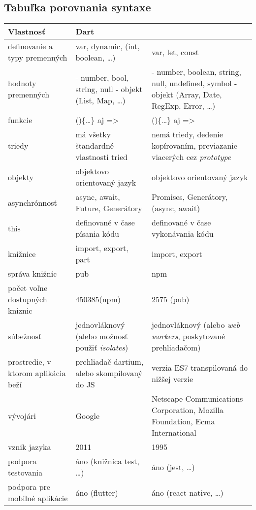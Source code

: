\subsection{Tabuľka porovnania syntaxe}
\label{tab:compare}

\begin{tabular}{| p{4cm} | p{5cm} | p{5cm} |}
 \hline         %
   Vlastnosť & Dart & \JS{} \\ %
  \hline
  \hline
   definovanie a typy premenných & 
   var, dynamic,  (int, boolean, \ldots)& %
   var, let, const \\
  \hline
   hodnoty premenných & 
   - number, bool, string, null \newline
   - objekt (List, Map, \ldots)
    & 
   - number, boolean, string, null, undefined, symbol \newline
   - objekt (Array, Date, RegExp, Error, \ldots)
    \\
  \hline
   funkcie & 
   ()\{\ldots\} aj => & 
   ()\{\ldots\} aj => \\
  \hline
   triedy & 
   má všetky štandardné vlastnosti tried & 
   nemá triedy, dedenie kopírovaním, previazanie viacerých cez \emph{prototype} \\
  \hline
   objekty & 
   objektovo orientovaný jazyk & 
   objektovo orientovaný jazyk \\
  \hline
   asynchrónnosť &
   async, await, Future, Generátory & 
   Promises, Generátory, (async, await) \\
  \hline
   this & 
   definované v čase písania kódu & 
   definované v čase vykonávania kódu \\
  \hline
   knižnice & 
   import, export, part & 
   import, export \\
  \hline
   správa knižníc & 
   pub & 
   npm \\
  \hline
   počet voľne dostupných kniznic & 
   450385\footnotemark (npm) & 
   2575 (pub) \\
  \hline
   súbežnosť & 
   jednovláknový (alebo možnosť použiť \emph{isolates}) & 
   jednovláknový (alebo \emph{web workers}, poskytované prehliadačom) \\
  \hline
   prostredie, v ktorom aplikácia beží & 
   prehliadač dartium, alebo skompilovaný do JS & 
   verzia ES7 transpilovaná do nižšej verzie \\
  \hline
   vývojári & 
   Google & 
   Netscape Communications Corporation, Mozilla Foundation, Ecma International \\
  \hline
   vznik jazyka & 
   2011 & 
   1995 \\
  \hline
   podpora testovania & 
   áno (knižnica test, \ldots) & 
   áno (jest, \ldots) \\
  \hline
  podpora pre mobilné aplikácie & 
  áno (flutter) & 
  áno (react-native, \ldots) \\
  \hline
 \end{tabular}
